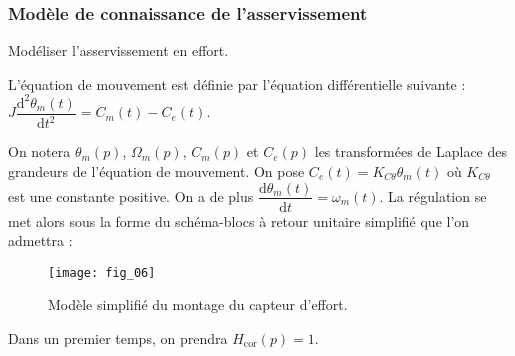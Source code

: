 \subsubsection*{Modèle de connaissance de l'asservissement}

\begin{obj}
Modéliser l’asservissement en effort.
\end{obj}

\ifprof
\else


L’équation de mouvement est définie par l’équation différentielle suivante : 
$J\dfrac{\text{d}^2\theta_m(t)}{\text{d}t^2}=C_m(t)-C_e(t)$.



On notera $\theta_m(p)$, $\Omega_m(p)$, $C_m(p)$ et $C_e(p)$ les transformées de Laplace des grandeurs de l’équation de mouvement.
On pose $C_e(t)=K_{C\theta}\theta_m(t)$ où  $K_{C\theta}$ est une constante positive. On a de plus $\dfrac{\text{d}\theta_m(t)}{\text{d}t}=\omega_m(t)$. La régulation se met alors sous la forme du schéma-blocs à retour unitaire simplifié que l’on
admettra :


\begin{figure}[!h]
\centering
\texttt{[image: fig\_06]}

\caption{Modèle simplifié du montage du capteur d’effort.}
\end{figure}

Dans un premier temps, on prendra $H_{\text{cor}}(p)=1$.
\fi

